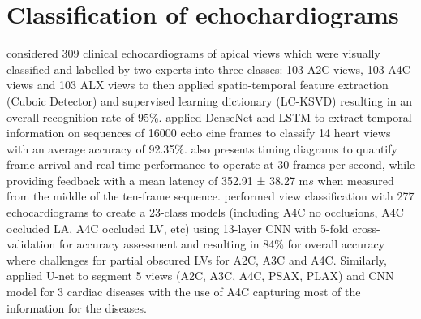 \documentclass[mlabstract,twocolumn]{jmlr}
\begin{document}
\section{Classification of echochardiograms} \label{subsec:nns_echochardiograms}
\citet{khamis2017} considered 309 clinical echocardiograms of apical views which were visually classified and labelled by two experts into three classes: 103 A2C views, 103 A4C views and 103 ALX views to then applied spatio-temporal feature extraction (Cuboic Detector) and supervised learning dictionary (LC-KSVD) resulting in an overall recognition rate of 95\%.
\citet{woudenberg2018} applied DenseNet and LSTM to extract temporal information on sequences of 16000 echo cine frames to classify 14 heart views with an average accuracy of 92.35\%.
\citet{woudenberg2018} also presents timing diagrams to quantify frame arrival and real-time performance to operate at 30 frames per second, while providing feedback with a mean latency of 352.91 ± 38.27 m$s$ when measured from the middle of the ten-frame sequence.
\citet{zhang2018} performed view classification with 277 echocardiograms to create a 23-class models (including A4C no occlusions, A4C occluded LA, A4C occluded LV, etc) using 13-layer CNN with 5-fold cross-validation for accuracy assessment and resulting in 84\% for overall accuracy where challenges for partial obscured LVs for A2C, A3C and A4C.
Similarly, \citet{zhang2018} applied U-net to segment 5 views (A2C, A3C, A4C, PSAX, PLAX) and CNN model for 3 cardiac diseases with the use of A4C capturing most of the information for the diseases.
\end{document}
